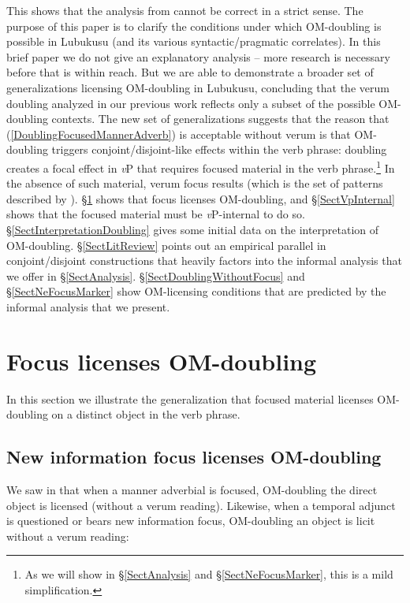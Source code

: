 \documentclass[output=paper]{langscibook}
\begin{document}
This shows that the analysis from \citet{SikukuEtAl:2018:LubukusuOM} cannot be correct in a strict sense. The purpose of this paper is to clarify the conditions under which OM-doubling is possible in Lubukusu (and its various syntactic/pragmatic correlates). In this brief paper we do not give an explanatory analysis -- more research is necessary before that is within reach. But we are able to demonstrate a broader set of generalizations licensing OM-doubling in Lubukusu, concluding that the verum doubling analyzed in our previous work reflects only a subset of the possible OM-doubling contexts. The new set of generalizations suggests that the reason that (\ref{DoublingFocusedMannerAdverb}) is acceptable without verum is that OM-doubling triggers conjoint/disjoint-like effects within the verb phrase: doubling creates a focal effect in \textit{v}P that requires focused material in the verb phrase.\footnote{As we will show in \S \ref{SectAnalysis} and \S \ref{SectNeFocusMarker}, this is a mild simplification.} In the absence of such material, verum focus results (which is the set of patterns described by \citealt{SikukuEtAl:2018:LubukusuOM}). \S \ref{SectFocusLicensesDoubling} shows that focus licenses OM-doubling, and \S \ref{SectVpInternal} shows that the focused material must be \textit{v}P-internal to do so. \S \ref{SectInterpretationDoubling} gives some initial data on the interpretation of OM-doubling. \S \ref{SectLitReview} points out an empirical parallel in conjoint/disjoint constructions that heavily factors into the informal analysis that we offer in \S \ref{SectAnalysis}. \S \ref{SectDoublingWithoutFocus} and \S \ref{SectNeFocusMarker} show OM-licensing conditions that are predicted by the informal analysis that we present.

\section{Focus licenses OM-doubling} \label{SectFocusLicensesDoubling}

In this section we illustrate the generalization that focused material licenses OM-doubling on a distinct object in the verb phrase. 

\subsection{New information focus licenses OM-doubling}

We saw in  that when a manner adverbial is focused, OM-doubling the direct object is licensed (without a verum reading). Likewise, when a temporal adjunct is questioned or bears new information focus, OM-doubling an object is licit without a verum reading:
\end{document}
